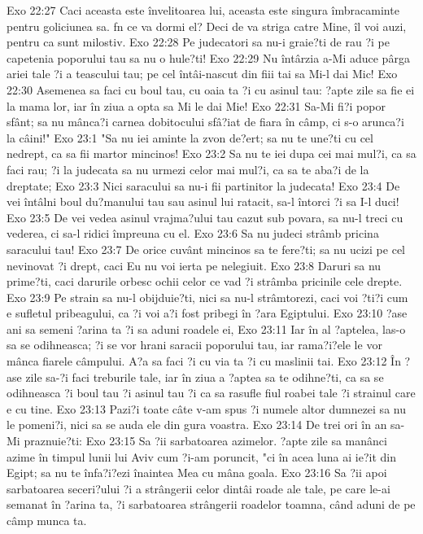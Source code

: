 Exo 22:27  Caci aceasta este învelitoarea lui, aceasta este singura îmbracaminte pentru goliciunea sa. fn ce va dormi el? Deci de va striga catre Mine, îl voi auzi, pentru ca sunt milostiv.
Exo 22:28  Pe judecatori sa nu-i graie?ti de rau ?i pe capetenia poporului tau sa nu o hule?ti!
Exo 22:29  Nu întârzia a-Mi aduce pârga ariei tale ?i a teascului tau; pe cel întâi-nascut din fiii tai sa Mi-l dai Mic!
Exo 22:30  Asemenea sa faci cu boul tau, cu oaia ta ?i cu asinul tau: ?apte zile sa fie ei la mama lor, iar în ziua a opta sa Mi le dai Mie!
Exo 22:31  Sa-Mi fi?i popor sfânt; sa nu mânca?i carnea dobitocului sfâ?iat de fiara în câmp, ci s-o arunca?i la câini!"
Exo 23:1  "Sa nu iei aminte la zvon de?ert; sa nu te une?ti cu cel nedrept, ca sa fii martor mincinos!
Exo 23:2  Sa nu te iei dupa cei mai mul?i, ca sa faci rau; ?i la judecata sa nu urmezi celor mai mul?i, ca sa te aba?i de la dreptate;
Exo 23:3  Nici saracului sa nu-i fii partinitor la judecata!
Exo 23:4  De vei întâlni boul du?manului tau sau asinul lui ratacit, sa-l întorci ?i sa I-l duci!
Exo 23:5  De vei vedea asinul vrajma?ului tau cazut sub povara, sa nu-l treci cu vederea, ci sa-l ridici împreuna cu el.
Exo 23:6  Sa nu judeci strâmb pricina saracului tau!
Exo 23:7  De orice cuvânt mincinos sa te fere?ti; sa nu ucizi pe cel nevinovat ?i drept, caci Eu nu voi ierta pe nelegiuit.
Exo 23:8  Daruri sa nu prime?ti, caci darurile orbesc ochii celor ce vad ?i strâmba pricinile cele drepte.
Exo 23:9  Pe strain sa nu-l obijduie?ti, nici sa nu-l strâmtorezi, caci voi ?ti?i cum e sufletul pribeagului, ca ?i voi a?i fost pribegi în ?ara Egiptului.
Exo 23:10  ?ase ani sa semeni ?arina ta ?i sa aduni roadele ei,
Exo 23:11  Iar în al ?aptelea, las-o sa se odihneasca; ?i se vor hrani saracii poporului tau, iar rama?i?ele le vor mânca fiarele câmpului. A?a sa faci ?i cu via ta ?i cu maslinii tai.
Exo 23:12  În ?ase zile sa-?i faci treburile tale, iar în ziua a ?aptea sa te odihne?ti, ca sa se odihneasca ?i boul tau ?i asinul tau ?i ca sa rasufle fiul roabei tale ?i strainul care e cu tine.
Exo 23:13  Pazi?i toate câte v-am spus ?i numele altor dumnezei sa nu le pomeni?i, nici sa se auda ele din gura voastra.
Exo 23:14  De trei ori în an sa-Mi praznuie?ti:
Exo 23:15  Sa ?ii sarbatoarea azimelor. ?apte zile sa manânci azime în timpul lunii lui Aviv cum ?i-am poruncit, "ci în acea luna ai ie?it din Egipt; sa nu te înfa?i?ezi înaintea Mea cu mâna goala.
Exo 23:16  Sa ?ii apoi sarbatoarea seceri?ului ?i a strângerii celor dintâi roade ale tale, pe care le-ai semanat în ?arina ta, ?i sarbatoarea strângerii roadelor toamna, când aduni de pe câmp munca ta.
